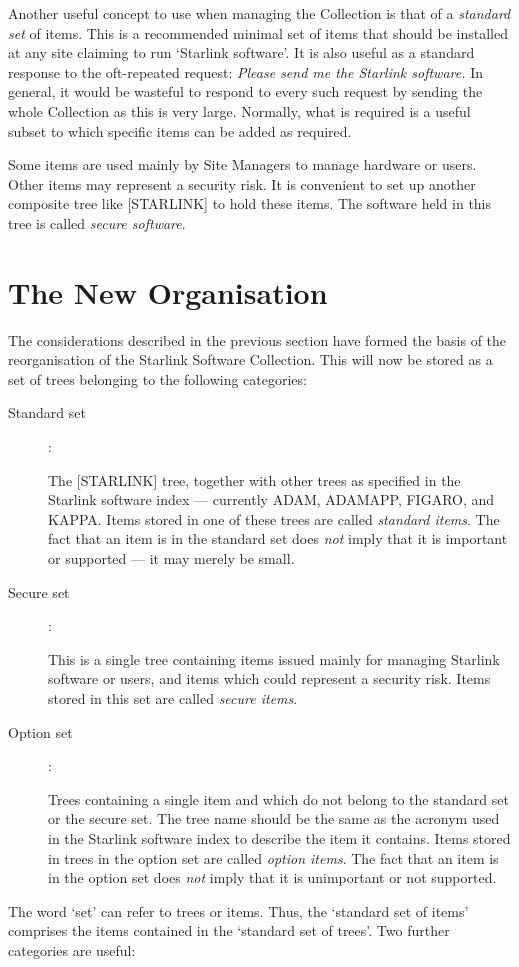 Another useful concept to use when managing the Collection is that of a
{\em standard set} of items.
This is a recommended minimal set of items that should be installed at any
site claiming to run `Starlink software'.
It is also useful as a standard response to the oft-repeated request: {\em
Please send me the Starlink software.}
In general, it would be wasteful to respond to every such request by sending
the whole Collection as this is very large.
Normally, what is required is a useful subset to which specific items can be
added as required.

Some items are used mainly by Site Managers to manage hardware or users.
Other items may represent a security risk.
It is convenient to set up another composite tree like [STARLINK] to hold these
items.
The software held in this tree is called {\em secure software}.

\section{The New Organisation}

The considerations described in the previous section have formed the basis
of the reorganisation of the Starlink Software Collection.
This will now be stored as a set of trees belonging to the following categories:
\begin{description}
\item [Standard set] :

 The [STARLINK] tree, together with other trees as specified in the Starlink
 software index --- currently ADAM, ADAMAPP, FIGARO, and KAPPA.
 Items stored in one of these trees are called {\em standard items}.
 The fact that an item is in the standard set does {\em not} imply that it is
 important or supported --- it may merely be small.

\item [Secure set] :

 This is a single tree containing items issued mainly for managing Starlink
 software or users, and items which could represent a security risk.
 Items stored in this set are called {\em secure items}.

\item [Option set] :

 Trees containing a single item and which do not belong to the standard set or
 the secure set.
 The tree name should be the same as the acronym used in the Starlink software
 index to describe the item it contains.
 Items stored in trees in the option set are called {\em option items}.
 The fact that an item is in the option set does {\em not} imply that it is
 unimportant or not supported.
 
\end{description}
The word `set' can refer to trees or items.
Thus, the `standard set of items' comprises the items contained in the `standard
set of trees'.
Two further categories are useful:

